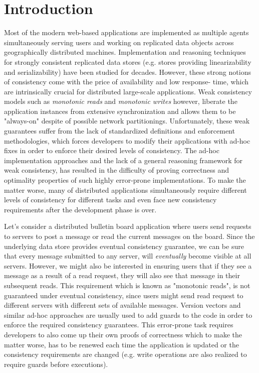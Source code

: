 \section{Introduction}

Most of the modern web-based applications are implemented as multiple
agents simultaneously serving users and working on replicated data
objects across geographically distributed machines. Implementation and
reasoning techniques for strongly consistent replicated data stores
(e.g. stores providing linearizability and serializability) have been
studied for decades.  However, these strong notions of consistency
come with the price of availability and low response- time, which are
intrinsically crucial for distributed large-scale applications. Weak
consistency models such as \emph{monotonic reads} and \emph{monotonic
writes} however, liberate the application instances from extensive
synchronization and allows them to be "always-on" despite of possible
network partitionings.  Unfortunately, these weak guarantees suffer
from the lack of standardized definitions and enforcement
methodologies, which forces developers to modify their applications
with ad-hoc fixes in order to enforce their desired levels of
consistency. The ad-hoc implementation approaches and the lack of a
general reasoning framework for weak consistency, has resulted in the
difficulty of proving correctness and optimality properties of such
highly error-prone implementations. To make the matter worse, many of
distributed applications simultaneously require different levels of
consistency for different tasks and even face new consistency
requirements after the development phase is over. 

Let's consider a distributed bulletin board application where users
send requests to servers to post a message or read the current
messages on the board. Since the underlying data store provides
eventual consistency guarantee, we can be sure that every message
submitted to any server, will \emph{eventually} become visible at all
servers.  However, we might also be interested in ensuring users that
if they see a message as a result of a read request, they will also
see that message in their subsequent reads. This requirement which is
known as "monotonic reads", is not guaranteed under eventual
consistency, since users might send read request to different servers
with different sets of available messages.  Version vectors and
similar ad-hoc approaches are usually used to add guards to the code
in order to enforce the required consistency guarantees. This
error-prone task requires developers to also come up their own proofs
of correctness which to make the matter worse, has to be renewed each
time the application is updated or the consistency requirements are
changed (e.g. write operations are also realized to require guards
before executions). 

